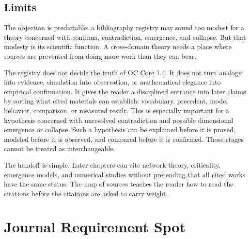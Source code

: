 \documentclass[11pt,a4paper,openany]{book}
\begin{document}
\subsection{Limits}
The objection is predictable: a bibliography registry may sound too modest for a theory concerned with continua, contradiction, emergence, and collapse. But that modesty is its scientific function. A cross-domain theory needs a place where sources are prevented from doing more work than they can bear. \cite{raf_networks,bak_soc}\par
The registry does not decide the truth of OC Core 1.4. It does not turn analogy into evidence, simulation into observation, or mathematical elegance into empirical confirmation. It gives the reader a disciplined entrance into later claims by sorting what cited materials can establish: vocabulary, precedent, model behavior, comparison, or measured result. This is especially important for a hypothesis concerned with unresolved contradiction and possible dimensional emergence or collapse. Such a hypothesis can be explained before it is proved, modeled before it is observed, and compared before it is confirmed. Those stages cannot be treated as interchangeable.\par
The handoff is simple. Later chapters can cite network theory, criticality, emergence models, and numerical studies without pretending that all cited works have the same status. The map of sources teaches the reader how to read the citations before the citations are asked to carry weight.\par
\section{Journal Requirement Spot}
\end{document}
